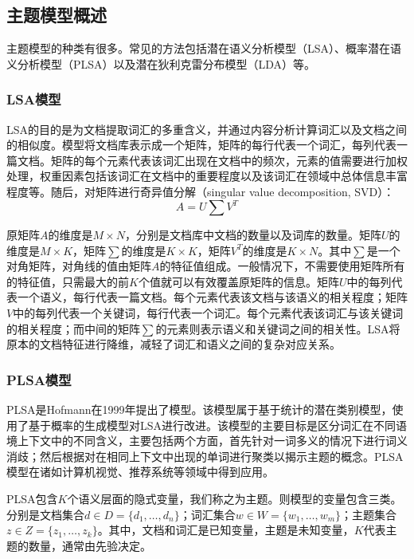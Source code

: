 \subsection{主题模型概述}

主题模型的种类有很多。常见的方法包括潜在语义分析模型（LSA）、概率潜在语义分析模型（PLSA）以及潜在狄利克雷分布模型（LDA）等。

\subsubsection{LSA模型}
LSA\cite{deerwester1990indexing}的目的是为文档提取词汇的多重含义，并通过内容分析计算词汇以及文档之间的相似度。模型将文档库表示成一个矩阵，矩阵的每行代表一个词汇，每列代表一篇文档。矩阵的每个元素代表该词汇出现在文档中的频次，元素的值需要进行加权处理，权重因素包括该词汇在文档中的重要程度以及该词汇在领域中总体信息丰富程度等。随后，对矩阵进行奇异值分解（singular value decomposition, SVD）\cite{higham2015singular}：
\begin{equation}
	A = U\sum V^T
\end{equation}

原矩阵$A$的维度是$M \times N$，分别是文档库中文档的数量以及词库的数量。矩阵$U$的维度是$M \times K$，矩阵$\sum$的维度是$K \times K$，矩阵$V^T$的维度是$K \times N$。其中$\sum$是一个对角矩阵，对角线的值由矩阵$A$的特征值组成。一般情况下，不需要使用矩阵所有的特征值，只需最大的前$K$个值就可以有效覆盖原矩阵的信息。矩阵$U$中的每列代表一个语义，每行代表一篇文档。每个元素代表该文档与该语义的相关程度；矩阵$V$中的每列代表一个关键词，每行代表一个词汇。每个元素代表该词汇与该关键词的相关程度；而中间的矩阵$\sum$的元素则表示语义和关键词之间的相关性。LSA将原本的文档特征进行降维，减轻了词汇和语义之间的复杂对应关系。

\subsubsection{PLSA模型}
PLSA是Hofmann\cite{hofmann1999probabilistic}在1999年提出了模型。该模型属于基于统计的潜在类别模型，使用了基于概率的生成模型对LSA进行改进。该模型的主要目标是区分词汇在不同语境上下文中的不同含义，主要包括两个方面，首先针对一词多义的情况下进行词义消歧；然后根据对在相同上下文中出现的单词进行聚类以揭示主题的概念。PLSA模型在诸如计算机视觉、推荐系统等领域中得到应用。

PLSA包含$K$个语义层面的隐式变量，我们称之为主题。则模型的变量包含三类。分别是文档集合$d \in D = \{d_1, \dots, d_n\}$；词汇集合$w \in W = \{w_1, \dots, w_m\}$；主题集合$z \in Z = \{z_1, \dots, z_k\}$。其中，文档和词汇是已知变量，主题是未知变量，$K$代表主题的数量，通常由先验决定。

